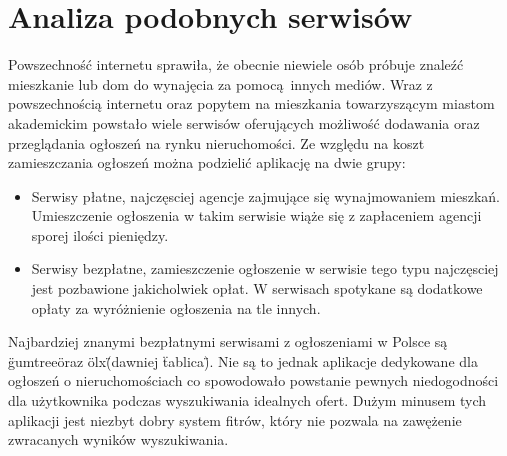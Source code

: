 
\section{Analiza podobnych serwisów}
\label{sec:analizaSerwisow}
Powszechność internetu sprawiła, że obecnie niewiele osób próbuje znaleźć mieszkanie lub dom do wynajęcia za pomocą innych mediów. Wraz z powszechnością internetu oraz popytem na mieszkania towarzyszącym miastom akademickim powstało wiele serwisów oferujących możliwość dodawania oraz przeglądania ogłoszeń na rynku nieruchomości. Ze względu na koszt zamieszczania ogłoszeń można podzielić aplikację na dwie grupy:
\begin{itemize}
\item Serwisy płatne, najczęsciej agencje zajmujące się wynajmowaniem mieszkań. Umieszczenie ogłoszenia w takim serwisie wiąże się z zapłaceniem agencji sporej ilości pieniędzy.
\item Serwisy bezpłatne, zamieszczenie ogłoszenie w serwisie tego typu najczęsciej jest pozbawione jakicholwiek opłat. W serwisach spotykane są dodatkowe opłaty za wyróżnienie ogłoszenia na tle innych.
\end{itemize}
Najbardziej znanymi bezpłatnymi serwisami z ogłoszeniami w Polsce są \"gumtree\" oraz \"olx\" (dawniej \"tablica\"). Nie są to jednak aplikacje dedykowane dla ogłoszeń o nieruchomościach co spowodowało powstanie pewnych niedogodności dla użytkownika podczas wyszukiwania idealnych ofert. Dużym minusem tych aplikacji jest niezbyt dobry system fitrów, który nie pozwala na zawężenie zwracanych wyników wyszukiwania.
